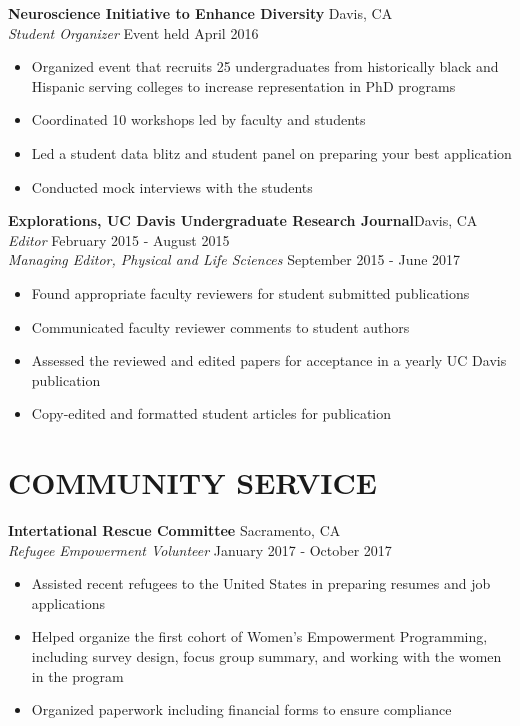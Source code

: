 \documentclass[line,margin,10pt]{res}
\begin{document}
\begin{resume}
 \textbf{Neuroscience Initiative to Enhance Diversity} \hfill
Davis, CA\\
{\sl Student Organizer} \hfill Event held April 2016
\begin{itemize}\itemsep -2pt
\item Organized event that recruits 25 undergraduates from historically black and Hispanic serving colleges to increase representation in PhD programs
\item Coordinated 10 workshops led by faculty and students
\item Led a student data blitz and student panel on preparing your best application
\item Conducted mock interviews with the students
\end{itemize}

\textbf{Explorations, UC Davis Undergraduate Research Journal}\hfill Davis, CA\\{\sl Editor} \hfill February 2015 - August 2015\\
{\sl Managing Editor, Physical and Life Sciences} \hfill September 2015 - June 2017
\begin{itemize}\itemsep -2pt
\item Found appropriate faculty reviewers for student submitted publications
\item Communicated faculty reviewer comments to student authors
\item Assessed the reviewed and edited papers for acceptance in a yearly UC Davis publication
\item Copy-edited and formatted student articles for publication
\end{itemize}


\section{COMMUNITY SERVICE}
\textbf{Intertational Rescue Committee}\hfill
Sacramento, CA\\
{\sl Refugee Empowerment Volunteer} \hfill January 2017 - October 2017
\begin{itemize}
\item Assisted recent refugees to the United States in preparing resumes and job applications
\item Helped organize the first cohort of Women's Empowerment Programming, including survey design, focus group summary, and working with the women in the program
\item Organized paperwork including financial forms to ensure compliance %
\end{itemize}


\end{resume}
\end{document}
